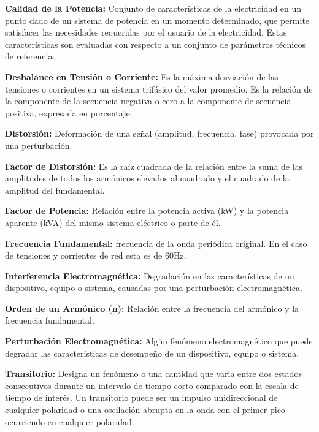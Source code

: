 \textbf{Calidad de la Potencia:} Conjunto de características de la electricidad en un punto dado de un sistema de potencia en un momento determinado, que permite satisfacer las necesidades requeridas por el usuario de la electricidad. Estas características son evaluadas con respecto a un conjunto de parámetros técnicos de referencia.

\textbf{Desbalance en Tensión o Corriente:} Es la máxima desviación de las tensiones o corrientes en un sistema trifásico del valor promedio. Es la relación de la componente de la secuencia negativa o cero a la componente de secuencia positiva, expresada en porcentaje.

\textbf{Distorsión:} Deformación de una señal (amplitud, frecuencia, fase) provocada por una perturbación.

\textbf{Factor de Distorsión:} Es la raíz cuadrada de la relación entre la suma de las amplitudes de todos los armónicos elevados al cuadrado y el cuadrado de la amplitud del fundamental.

\textbf{Factor de Potencia:} Relación entre la potencia activa (kW) y la potencia aparente (kVA) del mismo sistema eléctrico o parte de él.

\textbf{Frecuencia Fundamental:} frecuencia de la onda periódica original. En el caso de tensiones y corrientes de red esta es de 60Hz.

\textbf{Interferencia Electromagnética:} Degradación en las características de un dispositivo, equipo o sistema, causadas por una perturbación electromagnética.

\textbf{Orden de un Armónico (n):} Relación entre la frecuencia del armónico y la frecuencia fundamental.

\textbf{Perturbación Electromagnética:} Algún fenómeno electromagnético que puede degradar las características de desempeño de un dispositivo, equipo o sistema.

\textbf{Transitorio:} Designa un fenómeno o una cantidad que varia entre dos estados consecutivos durante un intervalo de tiempo corto comparado con la escala de tiempo de interés. Un transitorio puede ser un impulso unidireccional de cualquier polaridad o una oscilación abrupta en la onda con el primer pico ocurriendo en cualquier polaridad.